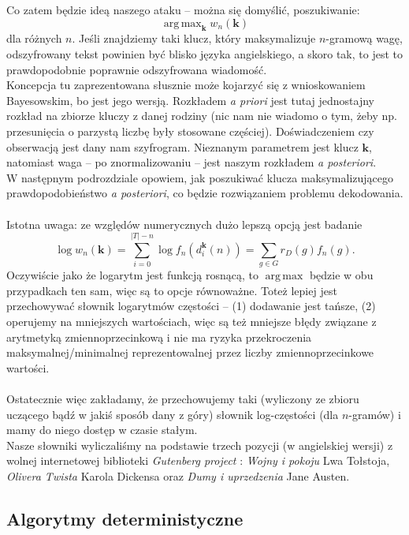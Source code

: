 \documentclass[a4paper]{article}
\DeclareMathOperator*{\argmax}{arg\,max}
\theoremstyle{defn}
\theoremstyle{theorem}
\theoremstyle{lemma}
\theoremstyle{cor}
\theoremstyle{fact}
\begin{document}
Co zatem będzie ideą naszego ataku – można się domyślić, poszukiwanie:
$$ \argmax_{\boldsymbol{k}} w_n(\boldsymbol{k}) $$
dla różnych $n$. Jeśli znajdziemy taki klucz, który maksymalizuje $n$-gramową wagę, odszyfrowany tekst powinien być blisko języka angielskiego, a skoro tak, to jest to prawdopodobnie poprawnie odszyfrowana wiadomość.\\
Koncepcja tu zaprezentowana słusznie może kojarzyć się z wnioskowaniem Bayesowskim, bo jest jego wersją. Rozkładem \textit{a priori} jest tutaj jednostajny rozkład na zbiorze kluczy z danej rodziny (nic nam nie wiadomo o tym, żeby np. przesunięcia o parzystą liczbę były stosowane częściej). Doświadczeniem czy obserwacją jest dany nam szyfrogram. Nieznanym parametrem jest klucz $\boldsymbol{k}$, natomiast waga – po znormalizowaniu – jest naszym rozkładem \textit{a posteriori}.\\
W następnym podrozdziale opowiem, jak poszukiwać klucza maksymalizującego prawdopodobieństwo \textit{a posteriori}, co będzie rozwiązaniem problemu dekodowania.\\\\
Istotna uwaga: ze względów numerycznych dużo lepszą opcją jest badanie $$\log w_n(\boldsymbol{k}) = \sum\limits_{i=0}^{|T|-n} \log f_n(d_i^{\boldsymbol{k}}(n)) = \sum\limits_{g \in G}{r_D(g)} f_n(g).$$ 
Oczywiście jako że logarytm jest funkcją rosnącą, to $\argmax$ będzie w obu przypadkach ten sam, więc są to opcje równoważne. Toteż lepiej jest przechowywać słownik logarytmów częstości – (1) dodawanie jest tańsze, (2) operujemy na mniejszych wartościach, więc są też mniejsze błędy związane z arytmetyką zmiennoprzecinkową i nie ma ryzyka przekroczenia maksymalnej/minimalnej reprezentowalnej przez liczby zmiennoprzecinkowe wartości.\\\\
Ostatecznie więc zakładamy, że przechowujemy taki (wyliczony ze zbioru uczącego bądź w jakiś sposób dany z góry) słownik log-częstości (dla $n$-gramów) i mamy do niego dostęp w czasie stałym.
\\
Nasze słowniki wyliczaliśmy na podstawie trzech pozycji (w angielskiej wersji) z wolnej internetowej biblioteki \textit{Gutenberg project} \cite{gutenberg}: \textit{Wojny i pokoju} Lwa Tołstoja, \textit{Olivera Twista} Karola Dickensa oraz \textit{Dumy i uprzedzenia} Jane Austen.
\subsection{Algorytmy deterministyczne}
\label{sect4.4}
\end{document}
